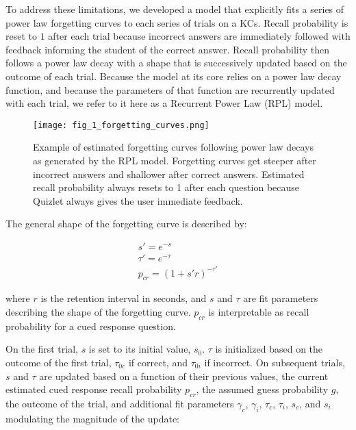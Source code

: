 \documentclass[a4paper,12pt]{article}
\begin{document}
To address these limitations, we developed a model that explicitly fits a series of power law forgetting curves to each series of trials on a KCs. Recall probability is reset to $1$ after each trial because incorrect answers are immediately followed with feedback informing the student of the correct answer. Recall probability then follows a power law decay with a shape that is successively updated based on the outcome of each trial. Because the model at its core relies on a power law decay function, and because the parameters of that function are recurrently updated with each trial, we refer to it here as a Recurrent Power Law (RPL) model.

\begin{figure}[H]
\centering
\texttt{[image: fig\_1\_forgetting\_curves.png]}
\caption{Example of estimated forgetting curves following power law decays as generated by the RPL model. Forgetting curves get steeper after incorrect answers and shallower after correct answers. Estimated recall probability always resets to 1 after each question because Quizlet always gives the user immediate feedback. }
\end{figure}

The general shape of the forgetting curve is described by:

\begin{eqnarray}
s\prime = e^{-s} \\
\tau\prime = e^{-\tau}  \\
p_{cr} = (1 + s\prime r)^{-\tau\prime}
\end{eqnarray}

	where $r$ is the retention interval in seconds, and $s$ and $\tau$ are fit parameters describing the shape of the forgetting curve. $p_{cr}$ is interpretable as recall probability for a cued response question.
	
	On the first trial, $s$ is set to its initial value, $s_0$. $\tau$ is initialized based on the outcome of the first trial, $\tau_{0c}$ if correct, and $\tau_{0i}$ if incorrect. On subsequent trials, $s$ and $\tau$ are updated based on a function of their previous values, the current estimated cued response recall probability $p_{cr}$, the assumed guess probability $g$, the outcome of the trial, and additional fit parameters $\gamma_c$, $\gamma_i$, $\tau_c$, $\tau_i$, $s_c$, and $s_i$ modulating the magnitude of the update:
	
\end{document}
